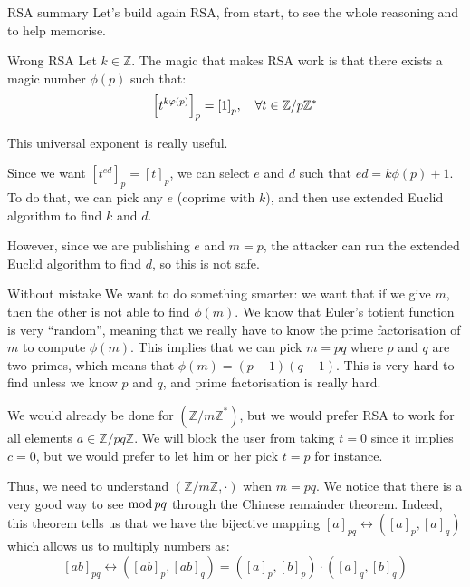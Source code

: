 \documentclass[a4paper]{article}
\begin{document}
\begin{parag}{RSA summary}
    Let's build again RSA, from start, to see the whole reasoning and to help memorise.

    \begin{subparag}{Wrong RSA}
        Let $k \in \mathbb{Z}$. The magic that makes RSA work is that there exists a magic number $\phi\left(p\right)$ such that: 
        \[\left[t^{k \phi\left(p\right)}\right]_p = \left[1\right]_p, \mathspace \forall t \in \mathbb{Z} / p\mathbb{Z}^*\]
        
        This universal exponent is really useful.

        Since we want $\left[t^{ed}\right]_p = \left[t\right]_p$, we can select $e$ and $d$ such that $ed = k\phi\left(p\right) + 1$. To do that, we can pick any $e$ (coprime with $k$), and then use extended Euclid algorithm to find $k$ and $d$.

        However, since we are publishing $e$ and $m = p$, the attacker can run the extended Euclid algorithm to find $d$, so this is not safe.
    \end{subparag}

    \begin{subparag}{Without mistake}
        We want to do something smarter: we want that if we give $m$, then the other is not able to find $\phi\left(m\right)$. We know that Euler's totient function is very ``random'', meaning that we really have to know the prime factorisation of $m$ to compute $\phi\left(m\right)$. This implies that we can pick $m = pq$ where $p$ and $q$ are two primes, which means that $\phi\left(m\right) = \left(p-1\right)\left(q-1\right)$. This is very hard to find unless we know $p$ and $q$, and prime factorisation is really hard.

        We would already be done for $\left(\mathbb{Z} / m\mathbb{Z}^*\right)$, but we would prefer RSA to work for all elements $a \in \mathbb{Z} / pq\mathbb{Z}$. We will block the user from taking $t = 0$ since it implies $c = 0$, but we would prefer to let him or her pick $t = p$ for instance.

        Thus, we need to understand $\left(\mathbb{Z} / m\mathbb{Z}, \cdot\right)$ when $m = pq$. We notice that there is a very good way to see $\operatorname{mod} pq$ through the Chinese remainder theorem. Indeed, this theorem tells us that we have the bijective mapping $\left[a\right]_{pq} \leftrightarrow \left(\left[a\right]_p, \left[a\right]_q\right)$ which allows us to multiply numbers as: 
        \[\left[ab\right]_{pq} \leftrightarrow \left(\left[ab\right]_p, \left[ab\right]_q\right) = \left(\left[a\right]_p, \left[b\right]_p\right) \cdot \left(\left[a\right]_q, \left[b\right]_q\right)\]


\end{subparag}
\end{parag}
\end{document}
